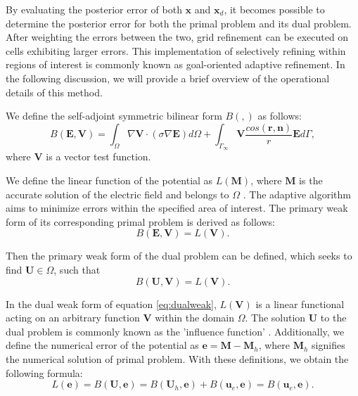 \documentclass[extra, referee]{gji}
\begin{document}
By evaluating the posterior error of both $\mathbf{x}$ and $\mathbf{x}_{d}$, it
becomes possible to determine the posterior error for both the primal problem
and its dual problem. After weighting the errors between the two, grid
refinement can be executed on cells exhibiting larger errors. This
implementation of selectively refining within regions of interest is commonly
known as goal-oriented adaptive refinement. In the following discussion, we will
provide a brief overview of the operational details of this method.

We define the self-adjoint symmetric bilinear form $B(, )$ as follows:
\begin{equation}
  \label{eq:testfundual0}
   B(\mathbf{E}, \mathbf{V}) = \int_{\Omega} \nabla \mathbf{V} \cdot (\sigma \nabla \mathbf{E}) {d}\Omega + \int_{ \Gamma_\infty}\mathbf{V}\frac{ {cos}(\mathbf{r}, \mathbf{n})}{r} {\mathbf{E}} {d}\Gamma,
\end{equation}
where $\mathbf{V}$ is a vector test function.

We define the linear function of the potential as $L(\mathbf{M})$, where
$\mathbf{M}$ is the accurate solution of the electric field and belongs to
$\Omega$  \citep{Ren2013}. The adaptive algorithm aims to minimize errors within
the specified area of interest. The  primary weak form of its corresponding
primal problem is derived as follows:
\begin{equation}
  \label{eq:testfundual11}
   B(\mathbf{E}, \mathbf{V}) = L(\mathbf{V}).
\end{equation}

Then the primary weak form of the dual problem can be defined, which seeks to
find $\mathbf{U} \in \Omega$, such that
\begin{equation}
  \label{eq:dualweak}
   B(\mathbf{U}, \mathbf{V}) = L(\mathbf{V}).
\end{equation}

In the dual weak form of equation \ref{eq:dualweak}, $L(\mathbf{V})$ is a linear
functional acting on an arbitrary function $\mathbf{V}$ within the domain
$\Omega$. The solution $\mathbf{U}$ to the dual problem is commonly known as the
'influence function' \citep{Oden2001}. Additionally, we define the numerical
error of the potential as $\mathbf{e} = \mathbf{M} -\mathbf{M}_h$, where
$\mathbf{M}_h$ signifies the numerical solution of primal problem. With these
definitions, we obtain the following formula:
\begin{equation}
  \label{eq:testfundual1}
   L(\mathbf{e})=B(\mathbf{U}, \mathbf{e}) = B(\mathbf{U}_h, \mathbf{e})
     + B(\mathbf{u}_e, \mathbf{e})=B(\mathbf{u}_e, \mathbf{e}).
\end{equation}
\end{document}
